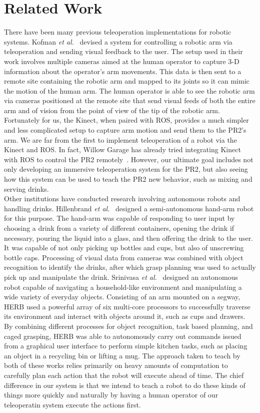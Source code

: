 \documentclass{sig-alternate}
\begin{document}
\section{Related Work}
\label{sec:related_work}
\indent There have been many previous teleoperation implementations for robotic systems. Kofman \textit{et al.}~\cite{robot_interface} devised a system for controlling a robotic arm via teleoperation and sending visual feedback to the user. The setup used in their work involves multiple cameras aimed at the human operator to capture 3-D information about the operator's arm movements. This data is then sent to a remote site containing the robotic arm and mapped to its joints so it can mimic the motion of the human arm. The human operator is able to see the robotic arm via cameras positioned at the remote site that send visual feeds of both the entire arm and of vision from the point of view of the tip of the robotic arm. Fortunately for us, the Kinect, when paired with ROS, provides a much simpler and less complicated setup to capture arm motion and send them to the PR2's arm. We are far from the first to implement teleoperation of a robot via the Kinect and ROS. In fact, Willow Garage has already tried integrating Kinect with ROS to control the PR2 remotely~\cite{willow_kinect}. However, our ultimate goal includes not only developing an immersive teleoperation system for the PR2, but also seeing how this system can be used to teach the PR2 new behavior, such as mixing and serving drinks.\\ 
\indent Other institutions have conducted research involving autonomous robots and handling drinks. Hillenbrand \textit{et al.}~\cite{pouring_arm} designed a semi-autonomous hand-arm robot for this purpose. The hand-arm was capable of responding to user input by choosing a drink from a variety of different containers, opening the drink if necessary, pouring the liquid into a glass, and then offering the drink to the user. It was capable of not only picking up bottles and cups, but also of unscrewing bottle caps. Processing of visual data from cameras was combined with object recognition to identify the drinks, after which grasp planning was used to actually pick up and manipulate the drink. Srinivasa \textit{et al.}~\cite{herb} designed an autonomous robot capable of navigating a household-like environment and manipulating a wide variety of everyday objects. Consisting of an arm mounted on a segway, HERB used a powerful array of six multi-core processors to successfully traverse its environment and interact with objects around it, such as cups and drawers. By combining different processes for object recognition, task based planning, and caged grasping, HERB was able to autonomously carry out commands issued from a graphical user interface to perform simple kitchen tasks, such as placing an object in a recycling bin or lifting a mug. The approach taken to teach by both of these works relies primarily on heavy amounts of computation to carefully plan each action that the robot will execute ahead of time.  The chief difference in our system is that we intend to teach a robot to do these kinds of things more quickly and naturally by having a human operator of our teleoperatin system execute the actions first.\\
\end{document}
